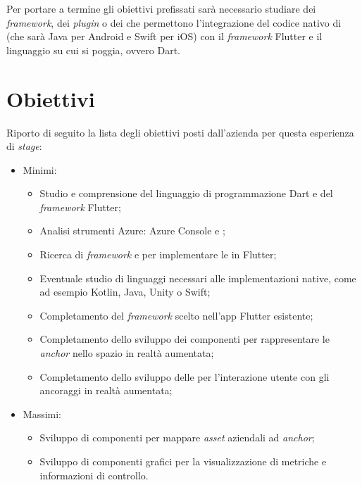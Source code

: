 Per portare a termine gli obiettivi prefissati sarà necessario studiare dei \textit{framework}, dei \textit{plugin} o dei \sdk{} che permettono l'integrazione del codice nativo di \asa{} (che sarà Java per Android e Swift per iOS) con il \textit{framework} Flutter e il linguaggio su cui si poggia, ovvero Dart. 

\section{Obiettivi}
Riporto di seguito la lista degli obiettivi posti dall'azienda per questa esperienza di \textit{stage}:
\begin{itemize}
    \item Minimi:
        \begin{itemize}
            \item Studio e comprensione del linguaggio di programmazione Dart e del \textit{framework} Flutter;
            \item Analisi strumenti Azure: Azure Console e \asa{};
            \item Ricerca di \textit{framework} e \sdk{} per implementare le \asa{} in Flutter;
            \item Eventuale studio di linguaggi necessari alle implementazioni native, come ad esempio Kotlin, Java, Unity o Swift;
            \item Completamento del \textit{framework} scelto nell'app Flutter esistente;
            \item Completamento dello sviluppo dei componenti per rappresentare le \textit{anchor} nello spazio in realtà aumentata;
            \item Completamento dello sviluppo delle \api{} per l'interazione utente con gli ancoraggi in realtà aumentata;
        \end{itemize}
    \item Massimi: 
        \begin{itemize}
            \item Sviluppo di componenti per mappare \textit{asset} aziendali ad \textit{anchor};
            \item Sviluppo di componenti grafici per la visualizzazione di metriche e informazioni di controllo.
        \end{itemize}
\end{itemize}

